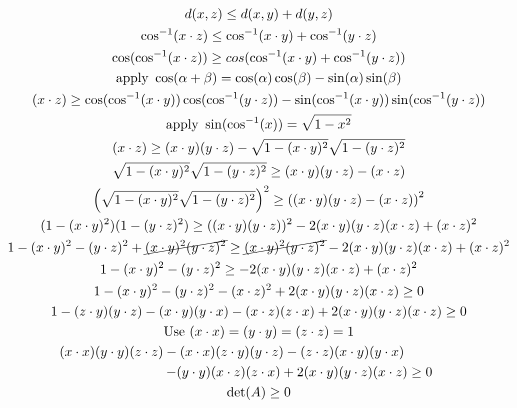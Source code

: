 \documentclass{jhwhw}
\begin{document}
\begin{gather}
d(x,z)\le d(x,y)+d(y,z)\\
\cos^{-1}(x\cdot z) \le \cos^{-1}(x\cdot y) + \cos^{-1}(y\cdot z)\\
\cos(\cos^{-1}(x\cdot z)) \ge cos(\cos^{-1}(x\cdot y) + \cos^{-1}(y\cdot z))\\
\text{apply } \cos(\alpha+\beta) = \cos(\alpha)\cos(\beta)-\sin(\alpha)\sin(\beta)\\
(x\cdot z) \ge \cos(\cos^{-1}(x\cdot y))\cos(\cos^{-1}(y\cdot z))-\sin(\cos^{-1}(x\cdot y))\sin(\cos^{-1}(y\cdot z))\\
\text{apply } \sin(\cos^{-1}(x)) = \sqrt{ 1 -x^2}\\
(x\cdot z) \ge (x\cdot y)(y\cdot z)-\sqrt{ 1 -(x\cdot y)^2}\sqrt{ 1 -(y\cdot z)^2}\\
\sqrt{ 1 -(x\cdot y)^2}\sqrt{ 1 -(y\cdot z)^2} \ge (x\cdot y)(y\cdot z)-(x\cdot z)\\
\left(\sqrt{ 1 -(x\cdot y)^2}\sqrt{ 1 -(y\cdot z)^2}\right)^2 \ge \left((x\cdot y)(y\cdot z)-(x\cdot z)\right)^2\\
( 1 -(x\cdot y)^2)(1 -(y\cdot z)^2) \ge ((x\cdot y)(y\cdot z))^2-2(x\cdot y)(y\cdot z)(x\cdot z)+(x\cdot z)^2\\
1 -(x\cdot y)^2-(y\cdot z)^2 + \cancel{(x\cdot y)^2(y\cdot z)^2} \ge \cancel{(x\cdot y)^2(y\cdot z)^2}-2(x\cdot y)(y\cdot z)(x\cdot z)+(x\cdot z)^2\\
1 -(x\cdot y)^2-(y\cdot z)^2  \ge -2(x\cdot y)(y\cdot z)(x\cdot z)+(x\cdot z)^2\\
1 -(x\cdot y)^2-(y\cdot z)^2-(x\cdot z)^2 + 2(x\cdot y)(y\cdot z)(x\cdot z) \ge 0\\
1-(z\cdot y)(y\cdot z) - (x\cdot y)(y\cdot x) - (x\cdot z)(z\cdot x) + 2 (x\cdot y)(y\cdot z)(x\cdot z) \ge 0\\
\text{Use } (x\cdot x)=(y\cdot y)=(z\cdot z)=1\\
(x\cdot x)(y\cdot y)(z\cdot z) -(x\cdot x)(z\cdot y)(y\cdot z) - (z\cdot z)(x\cdot y)(y\cdot x)  \qquad\qquad\nonumber\\
\qquad\qquad\qquad -(y\cdot y)(x\cdot z)(z\cdot x) + 2 (x\cdot y)(y\cdot z)(x\cdot z) \ge 0\\
\det(A) \ge 0
\end{gather}
\end{document}
